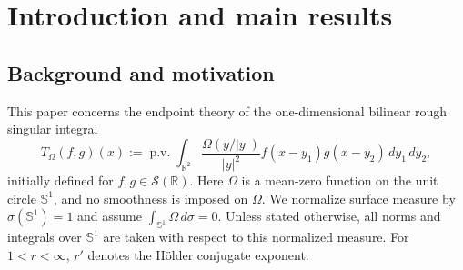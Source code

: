 \documentclass[11pt]{amsart}
\theoremstyle{remark}
\numberwithin{equation}{section}
\newcommand{\pv}{\operatorname{p.v.}}
\newcommand{\R}{\mathbb R}
\newcommand{\Sph}{\mathbb S^1}
\newcommand{\cK}{\mathcal K}
\newcommand{\abs}[1]{\left\lvert #1\right\rvert}
\begin{document}
	\begin{abstract}
	We prove endpoint theorems for  one-dimensional bilinear rough singular integrals.  The point of departure is a sharp structural description of the
	angular multiplier.  For every mean-zero \(\Omega\in L^1(\Sph)\), the
	finite-part angular multiplier associated with \(T_\Omega\) has bounded
	variation if and only if the antipodal even part of \(\Omega\) belongs to
	\(H^1(\Sph)\).  This identifies the exact rotational regularity needed for
	the one-dimensional bilinear problem and gives a Stieltjes decomposition
	compatible with uniform bilinear Hilbert transform estimates.
	We then deduce two endpoint boundedness criteria.  First, if
	\(\Omega\in L\log L(\Sph)\), then
	$
	T_\Omega:L^{p_1}(\R)\times L^{p_2}(\R)\to L^p(\R)
	$
	for all \(1<p_1,p_2,p<\infty\) with
	\(1/p=1/p_1+1/p_2\).  The logarithmic exponent \(1\) is optimal in the
	scale \(L(\log L)^A\).  Second, at the critical directional threshold,
	if \(\Omega\in\cK_{1/2,\beta}(\Sph)\), then the same boundedness holds
	whenever
	$
	\beta>\frac32\max\{p_1,p_1',p_2,p_2'\}-1 .
	$
	These two endpoint kernel classes are  incomparable.  The Orlicz
	endpoint is obtained by reducing the multiplier to a finite-part angular
	profile of bounded variation; the directional endpoint is proved through
	endpoint Fourier decay, product wavelet decompositions, and interpolation.
	\end{abstract}
	\maketitle
	\tableofcontents
	
	\section{Introduction and main results}
	
		\subsection{Background and motivation}This paper concerns the endpoint theory of the one-dimensional bilinear rough
	singular integral
	\begin{equation}\label{eq:T-def}
		T_\Omega(f,g)(x)
		:=
		\pv\int_{\R^2}
		\frac{\Omega(y/\abs y)}{\abs y^2}
		f(x-y_1)g(x-y_2)\,dy_1\,dy_2,
	\end{equation}
	initially defined for \(f,g\in\mathcal S(\R)\).  Here \(\Omega\) is a
	mean-zero function on the unit circle \(\Sph\), and no smoothness is imposed on
	\(\Omega\).   We normalize surface
	measure by \(\sigma(\Sph)=1\) and assume
	\(\int_{\Sph}\Omega\,d\sigma=0\).  Unless stated otherwise, all norms and
	integrals over \(\Sph\) are taken with respect to this normalized measure.  For
	\(1<r<\infty\), \(r'\) denotes the H\"older conjugate exponent.
	
\end{document}

